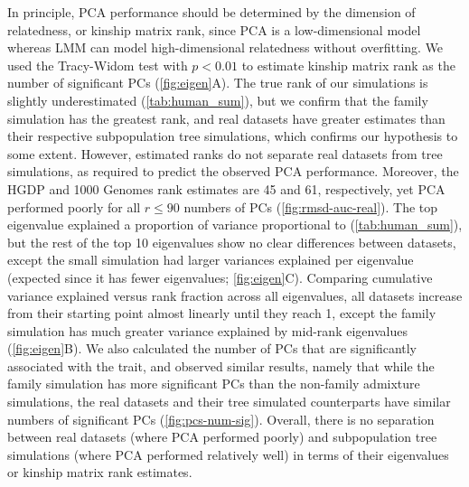 \documentclass[11pt]{article}
\begin{document}
\begin{linenumbers}
In principle, PCA performance should be determined by the dimension of relatedness, or kinship matrix rank, since PCA is a low-dimensional model whereas LMM can model high-dimensional relatedness without overfitting.
We used the Tracy-Widom test \citep{patterson_population_2006} with $p < 0.01$ to estimate kinship matrix rank as the number of significant PCs (\cref{fig:eigen}A).
The true rank of our simulations is slightly underestimated (\cref{tab:human_sum}), but we confirm that the family simulation has the greatest rank, and real datasets have greater estimates than their respective subpopulation tree simulations, which confirms our hypothesis to some extent.
However, estimated ranks do not separate real datasets from tree simulations, as required to predict the observed PCA performance.
Moreover, the HGDP and 1000 Genomes rank estimates are 45 and 61, respectively, yet PCA performed poorly for all $r \le 90$ numbers of PCs (\cref{fig:rmsd-auc-real}).
The top eigenvalue explained a proportion of variance proportional to \Fst (\cref{tab:human_sum}), but the rest of the top 10 eigenvalues show no clear differences between datasets, except the small simulation had larger variances explained per eigenvalue (expected since it has fewer eigenvalues; \cref{fig:eigen}C).
Comparing cumulative variance explained versus rank fraction across all eigenvalues, all datasets increase from their starting point almost linearly until they reach 1, except the family simulation has much greater variance explained by mid-rank eigenvalues (\cref{fig:eigen}B).
We also calculated the number of PCs that are significantly associated with the trait, and observed similar results, namely that while the family simulation has more significant PCs than the non-family admixture simulations, the real datasets and their tree simulated counterparts have similar numbers of significant PCs (\cref{fig:pcs-num-sig}).
Overall, there is no separation between real datasets (where PCA performed poorly) and subpopulation tree simulations (where PCA performed relatively well) in terms of their eigenvalues or kinship matrix rank estimates.


\end{linenumbers}
\end{document}

